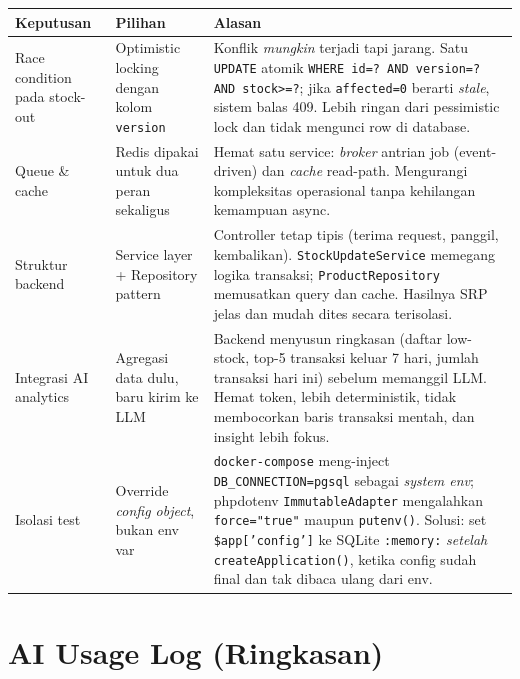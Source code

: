 \documentclass[11pt,a4paper]{article}
\begin{document}
\renewcommand{\arraystretch}{1.25}
\begin{table}[h]
\centering
\small
\begin{tabular}{@{}p{3cm} p{3.8cm} p{8.6cm}@{}}
\toprule
\textbf{Keputusan} & \textbf{Pilihan} & \textbf{Alasan} \\
\midrule
Race condition pada stock-out &
Optimistic locking dengan kolom \texttt{version} &
Konflik \emph{mungkin} terjadi tapi jarang. Satu \texttt{UPDATE} atomik
\texttt{WHERE id=? AND version=? AND stock>=?}; jika \texttt{affected=0} berarti
\emph{stale}, sistem balas 409. Lebih ringan dari pessimistic lock dan tidak
mengunci row di database. \\

Queue \& cache &
Redis dipakai untuk dua peran sekaligus &
Hemat satu service: \emph{broker} antrian job (event-driven) dan \emph{cache}
read-path. Mengurangi kompleksitas operasional tanpa kehilangan kemampuan async. \\

Struktur backend &
Service layer + Repository pattern &
Controller tetap tipis (terima request, panggil, kembalikan). \texttt{StockUpdateService}
memegang logika transaksi; \texttt{ProductRepository} memusatkan query dan cache. Hasilnya
SRP jelas dan mudah dites secara terisolasi. \\

Integrasi AI analytics &
Agregasi data dulu, baru kirim ke LLM &
Backend menyusun ringkasan (daftar low-stock, top-5 transaksi keluar 7 hari, jumlah
transaksi hari ini) sebelum memanggil LLM. Hemat token, lebih deterministik, tidak
membocorkan baris transaksi mentah, dan insight lebih fokus. \\

Isolasi test &
Override \emph{config object}, bukan env var &
\texttt{docker-compose} meng-inject \texttt{DB\_CONNECTION=pgsql} sebagai \emph{system env};
phpdotenv \texttt{ImmutableAdapter} mengalahkan \texttt{force="true"} maupun \texttt{putenv()}.
Solusi: set \texttt{\$app['config']} ke SQLite \texttt{:memory:} \emph{setelah}
\texttt{createApplication()}, ketika config sudah final dan tak dibaca ulang dari env. \\
\bottomrule
\end{tabular}
\end{table}

\section*{AI Usage Log (Ringkasan)}
\end{document}
